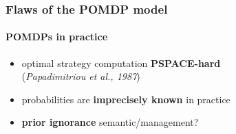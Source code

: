 \documentclass[12pt,svgnames,table]{beamer}
\begin{document}
\begin{frame}
\frametitle{Flaws of the POMDP model}
\framesubtitle{\footnotesize POMDPs in practice}
\begin{itemize}
\item optimal strategy computation \textbf{PSPACE-hard}\\
{ \footnotesize \hspace{4cm}(\textit{Papadimitriou et al., 1987})}
\end{itemize}
\vspace{0.6cm}
\begin{itemize}
\item probabilities are \textbf{imprecisely known} in practice
\end{itemize}
\vspace{1.2cm}
\begin{itemize}
\item \textbf{prior ignorance} semantic/management?
\end{itemize}
\end{frame}
\end{document}
